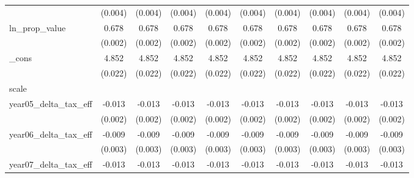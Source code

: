 {\begin{tabular}{l*{9}{c}}
            &     (0.004)         &     (0.004)         &     (0.004)         &     (0.004)         &     (0.004)         &     (0.004)         &     (0.004)         &     (0.004)         &     (0.004)         \\
[1em]
ln_prop_value&       0.678\sym{***}&       0.678\sym{***}&       0.678\sym{***}&       0.678\sym{***}&       0.678\sym{***}&       0.678\sym{***}&       0.678\sym{***}&       0.678\sym{***}&       0.678\sym{***}\\
            &     (0.002)         &     (0.002)         &     (0.002)         &     (0.002)         &     (0.002)         &     (0.002)         &     (0.002)         &     (0.002)         &     (0.002)         \\
[1em]
_cons       &       4.852\sym{***}&       4.852\sym{***}&       4.852\sym{***}&       4.852\sym{***}&       4.852\sym{***}&       4.852\sym{***}&       4.852\sym{***}&       4.852\sym{***}&       4.852\sym{***}\\
            &     (0.022)         &     (0.022)         &     (0.022)         &     (0.022)         &     (0.022)         &     (0.022)         &     (0.022)         &     (0.022)         &     (0.022)         \\
\hline
scale       &                     &                     &                     &                     &                     &                     &                     &                     &                     \\
year05_delta_tax_eff&      -0.013\sym{***}&      -0.013\sym{***}&      -0.013\sym{***}&      -0.013\sym{***}&      -0.013\sym{***}&      -0.013\sym{***}&      -0.013\sym{***}&      -0.013\sym{***}&      -0.013\sym{***}\\
            &     (0.002)         &     (0.002)         &     (0.002)         &     (0.002)         &     (0.002)         &     (0.002)         &     (0.002)         &     (0.002)         &     (0.002)         \\
[1em]
year06_delta_tax_eff&      -0.009\sym{***}&      -0.009\sym{***}&      -0.009\sym{***}&      -0.009\sym{***}&      -0.009\sym{***}&      -0.009\sym{***}&      -0.009\sym{***}&      -0.009\sym{***}&      -0.009\sym{***}\\
            &     (0.003)         &     (0.003)         &     (0.003)         &     (0.003)         &     (0.003)         &     (0.003)         &     (0.003)         &     (0.003)         &     (0.003)         \\
[1em]
year07_delta_tax_eff&      -0.013\sym{***}&      -0.013\sym{***}&      -0.013\sym{***}&      -0.013\sym{***}&      -0.013\sym{***}&      -0.013\sym{***}&      -0.013\sym{***}&      -0.013\sym{***}&      -0.013\sym{***}\\

\end{tabular}}
